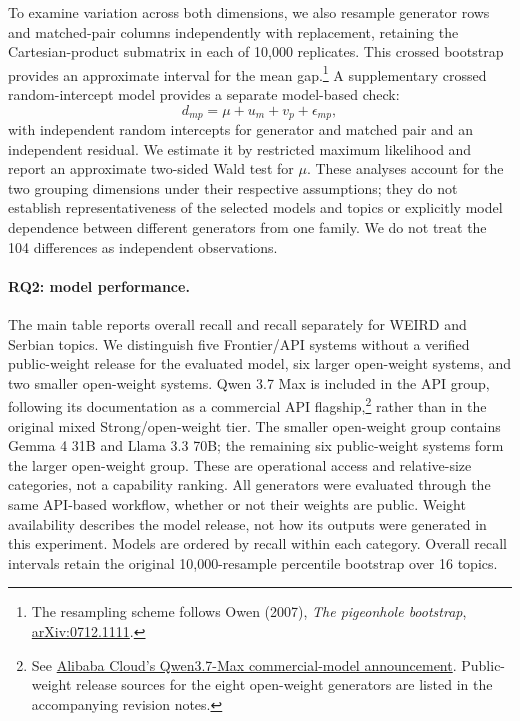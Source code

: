 To examine variation across both dimensions, we also resample generator
rows and matched-pair columns independently with replacement, retaining
the Cartesian-product submatrix in each of 10,000 replicates. This crossed
bootstrap provides an approximate interval for the mean gap.\footnote{The
resampling scheme follows Owen (2007), \emph{The pigeonhole bootstrap},
\href{https://arxiv.org/abs/0712.1111}{arXiv:0712.1111}.}
A supplementary
crossed random-intercept model provides a separate model-based check:
\begin{equation}
d_{mp}=\mu+u_m+v_p+\epsilon_{mp},
\label{eq:crossed}
\end{equation}
with independent random intercepts for generator and matched pair and
an independent residual. We estimate it by restricted maximum likelihood
and report an approximate two-sided Wald test for $\mu$. These analyses
account for the two grouping dimensions under their respective assumptions;
they do not establish representativeness of the selected models and topics
or explicitly model dependence between different generators from one family.
We do not treat the 104 differences as independent observations.

\paragraph{RQ2: model performance.}
The main table reports overall recall and recall separately for WEIRD and
Serbian topics. We distinguish five Frontier/API systems without a verified
public-weight release for the evaluated model, six larger open-weight
systems, and two smaller open-weight systems. Qwen 3.7 Max is included
in the API group, following its documentation as a commercial API flagship,\footnote{See
\href{https://www.alibabacloud.com/en/news/product/maxcompute-model-computing-service-supports-qwen37-max-and-other-commercial-models-mkv}{Alibaba Cloud's Qwen3.7-Max commercial-model announcement}.
Public-weight release sources for the eight open-weight generators are
listed in the accompanying revision notes.}
rather than in the original mixed Strong/open-weight tier. The smaller
open-weight group contains Gemma 4 31B and Llama 3.3 70B; the remaining
six public-weight systems form the larger open-weight group. These are
operational access and relative-size categories, not a capability ranking.
All generators were evaluated through the same API-based workflow, whether
or not their weights are public. Weight availability describes the model
release, not how its outputs were generated in this experiment.
Models are ordered by recall within each category. Overall recall intervals
retain the original 10,000-resample percentile bootstrap over 16 topics.

